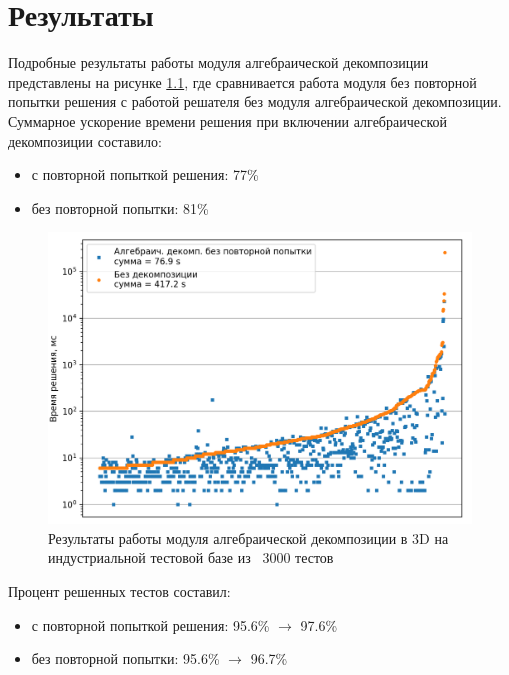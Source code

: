 \chapter{Результаты}\label{ch:results}

Подробные результаты работы модуля алгебраической декомпозиции представлены на рисунке \ref{fig:time_res}, где сравнивается работа модуля без повторной попытки решения с работой решателя без модуля алгебраической декомпозиции. Суммарное ускорение времени решения при включении алгебраической декомпозиции составило:
\begin{itemize}
    \item 
        с повторной попыткой решения: 77\% 
    \item
        без повторной попытки: 81\% 
\end{itemize}

\begin{figure}[h]
	\centering
	\includegraphics[width=0.6\linewidth]{figures/fig_time_results.png}
	\caption{Результаты работы модуля алгебраической декомпозиции в 3D на индустриальной тестовой базе из ~3000 тестов}
	\label{fig:time_res}
\end{figure}

Процент решенных тестов составил:
\begin{itemize}
    \item с повторной попыткой решения:  95.6\% $\rightarrow$ 97.6\%
    \item  без повторной попытки:  95.6\% $\rightarrow$ 96.7\%
\end{itemize}
